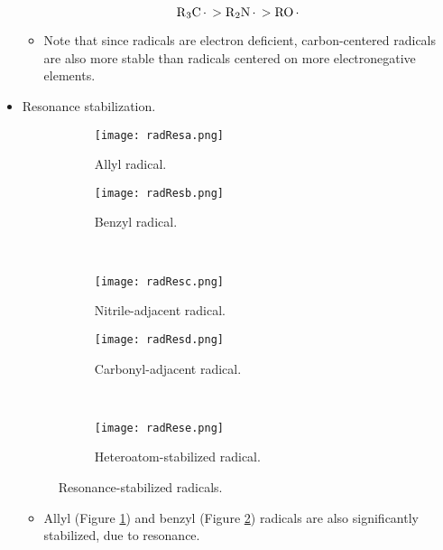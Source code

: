 \documentclass[../notes.tex]{subfiles}
\begin{document}
\begin{itemize}
    \begin{equation*}
        \ce{R3C*} > \ce{R2N*} > \ce{RO*}
    \end{equation*}
    \begin{itemize}
        \item Note that since radicals are electron deficient, carbon-centered radicals are also more stable than radicals centered on more electronegative elements.
    \end{itemize}
    \pagebreak
    \item Resonance stabilization.
    \begin{figure}[h!]
        \centering
        \begin{subfigure}[b]{0.32\linewidth}
            \centering
            \texttt{[image: radResa.png]}
            \caption{Allyl radical.}
            \label{fig:radResa}
        \end{subfigure}
        \begin{subfigure}[b]{0.32\linewidth}
            \centering
            \texttt{[image: radResb.png]}
            \caption{Benzyl radical.}
            \label{fig:radResb}
        \end{subfigure}\\[2em]
        \begin{subfigure}[b]{0.32\linewidth}
            \centering
            \texttt{[image: radResc.png]}
            \caption{Nitrile-adjacent radical.}
            \label{fig:radResc}
        \end{subfigure}
        \begin{subfigure}[b]{0.32\linewidth}
            \centering
            \texttt{[image: radResd.png]}
            \caption{Carbonyl-adjacent radical.}
            \label{fig:radResd}
        \end{subfigure}\\[2em]
        \begin{subfigure}[b]{\linewidth}
            \centering
            \texttt{[image: radRese.png]}
            \caption{Heteroatom-stabilized radical.}
            \label{fig:radRese}
        \end{subfigure}
        \caption{Resonance-stabilized radicals.}
        \label{fig:radRes}
    \end{figure}
    \begin{itemize}
        \item Allyl (Figure \ref{fig:radResa}) and benzyl (Figure \ref{fig:radResb}) radicals are also significantly stabilized, due to resonance.

\end{itemize}
\end{itemize}
\end{document}
